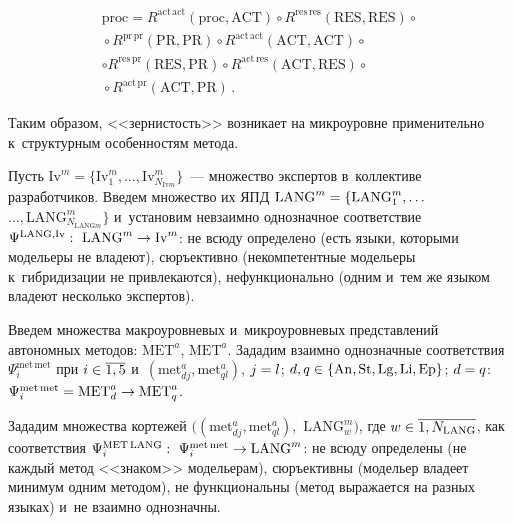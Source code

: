 \begin{multicols}{2}
\vspace*{-12pt}

\noindent
\begin{multline*}
\mathrm{proc}= R^{\mathrm{act\,act}}(\mathrm{proc, ACT}) \circ R^{\mathrm{res\,res}} 
(\mathrm{RES, RES}) \circ{}\\
{}\circ R^{\mathrm{pr\,pr}} (\mathrm{PR,PR})\circ 
R^{\mathrm{act\,act}}(\mathrm{ACT,ACT})\circ\\
\circ R^{\mathrm{res\,pr}}(\mathrm{RES, PR}) \circ R^{\mathrm{act\,res}} (\mathrm{ACT, 
RES}) \circ{}\\
{}\circ R^{\mathrm{act\,pr}}(\mathrm{ACT, PR})\,.
\end{multline*}
  
  Таким образом, <<зернистость>> возникает на мик\-ро\-уровне применительно 
к~структурным особенностям метода.
  
  Пусть $\mathrm{Iv}^m= \{ \mathrm{Iv}_1^m, \ldots , \mathrm{Iv}^m_{N_{\mathrm{Iv}m}}\}$~--- множество экспертов в~коллективе 
разработчиков. Введем множество их ЯПД $\mathrm{LANG}^m\hm= \{ 
\mathrm{LANG}_1^m,\ldots$\linebreak $\ldots, \mathrm{LANG}^m_{N_{\mathrm{LANG}m}}\}$ и~установим невзаимно 
однозначное соответствие $\Psi^{\mathrm{LANG,Iv}}:\ \mathrm{LANG}^m\hm\to 
\mathrm{Iv}^m$: не всюду 
определено (есть языки, которыми модельеры не владеют), сюръективно (некомпетентные 
модельеры к~гибридизации не привлекаются), нефункционально (одним и~тем же языком 
владеют несколько экспертов). 
  
  Введем множества макроуровневых и~микроуровневых представлений автономных 
методов: $\mathrm{MET}^a$, $\mathrm{MET}^a$. Зададим взаимно однозначные 
соответствия $\Psi_i^{\mathrm{met\,met}}$ при $i\hm\in \overline{1,5}$ 
и~$(\mathrm{met}^a_{dj}, \mathrm{met}^a_{ql})$, $j\hm=l$; $d,q\hm\in \{ 
\mathrm{An}, \mathrm{St}, \mathrm{Lg}, \mathrm{Li}, \mathrm{Ep}\}$; 
$d\hm= q$: $\Psi_i^{\mathrm{met\,met}}\hm= \mathrm{MET}_d^a\hm\to \mathrm{MET}_q^a$.
  
  Зададим множества кортежей $((\mathrm{met}^a_{dj}, \mathrm{met}^a_{ql}),$\linebreak
  $\mathrm{LANG}_w^m)$, где $w\hm\in \overline{1,N_{\mathrm{LANG}}}$, как соответствия 
$\Psi_i^{\mathrm{MET\,LANG}}:\ \Psi_i^{\mathrm{met\,met}}\hm\to \mathrm{LANG}^m$: не 
всюду определены (не каждый метод <<знаком>> модельерам), сюръективны (модельер 
владеет минимум одним методом), не функциональны (метод выражается на разных языках) 
и~не взаимно однозначны.
  

\end{multicols}
